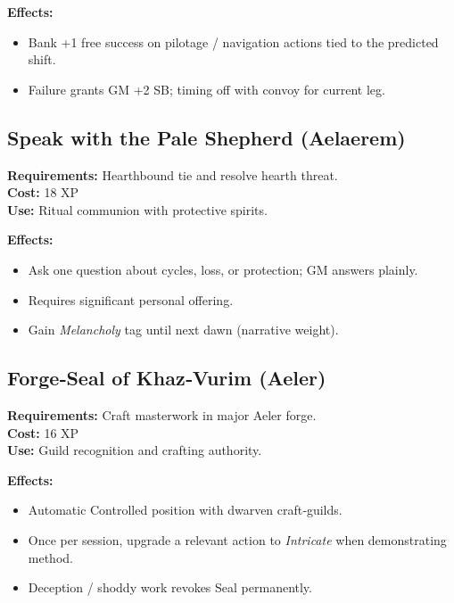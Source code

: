 \textbf{Effects:}
\begin{itemize}
    \item Bank +1 free success on pilotage / navigation actions tied to the predicted shift.
    \item Failure grants GM +2 SB; timing off with convoy for current leg.
\end{itemize}

\subsection{Speak with the Pale Shepherd (Aelaerem)}\label{subsec:pale_shepherd}

\textbf{Requirements:} Hearthbound tie and resolve hearth threat.\\
\textbf{Cost:} 18 XP\\
\textbf{Use:} Ritual communion with protective spirits.

\textbf{Effects:}
\begin{itemize}
    \item Ask one question about cycles, loss, or protection; GM answers plainly.
    \item Requires significant personal offering.
    \item Gain \emph{Melancholy} tag until next dawn (narrative weight).
\end{itemize}

\subsection{Forge‑Seal of Khaz‑Vurim (Aeler)}\label{subsec:forge_seal}

\textbf{Requirements:} Craft masterwork in major Aeler forge.\\
\textbf{Cost:} 16 XP\\
\textbf{Use:} Guild recognition and crafting authority.

\textbf{Effects:}
\begin{itemize}
    \item Automatic Controlled position with dwarven craft‑guilds.
    \item Once per session, upgrade a relevant action to \emph{Intricate} when demonstrating method.
    \item Deception / shoddy work revokes Seal permanently.
\end{itemize}

